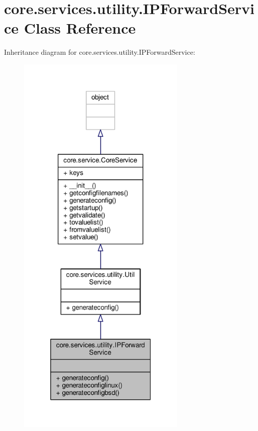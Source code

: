 \hypertarget{classcore_1_1services_1_1utility_1_1_i_p_forward_service}{\section{core.\+services.\+utility.\+I\+P\+Forward\+Service Class Reference}
\label{classcore_1_1services_1_1utility_1_1_i_p_forward_service}
}


Inheritance diagram for core.\+services.\+utility.\+I\+P\+Forward\+Service\+:
\nopagebreak
\begin{figure}[H]
\begin{center}
\leavevmode
\includegraphics[width=229pt]{classcore_1_1services_1_1utility_1_1_i_p_forward_service__inherit__graph}
\end{center}
\end{figure}


